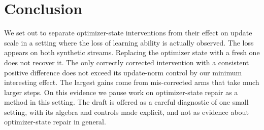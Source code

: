 \section{Conclusion}
\label{sec:conclusion}

We set out to separate optimizer-state interventions from their effect on update scale in a setting
where the loss of learning ability is actually observed. The loss appears on both synthetic streams.
Replacing the optimizer state with a fresh one does not recover it. The only correctly corrected
intervention with a consistent positive difference does not exceed its update-norm control by our
minimum interesting effect. The largest gains come from mis-corrected arms that take much larger steps.
On this evidence we pause work on optimizer-state repair as a method in this setting. The draft is
offered as a careful diagnostic of one small setting, with its algebra and controls made explicit, and
not as evidence about optimizer-state repair in general.
